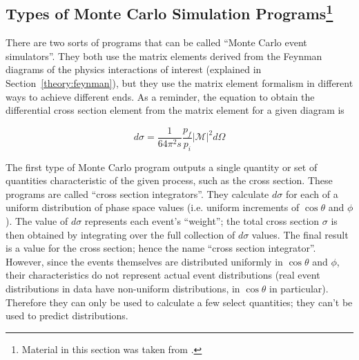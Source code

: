 \subsection{Types of Monte Carlo Simulation Programs\footnote{Material in this section was taken from \cite{MCLesHouchesGuide}.}}
\label{sim:MCexplain}




There are two sorts of programs that can be called 
``Monte Carlo event simulators''.  
They both use the matrix elements derived from 
the Feynman diagrams of the physics interactions of interest 
(explained in Section~\ref{theory:feynman}), %
but they use the matrix element formalism 
in different ways to achieve different ends.  
As a reminder, the equation to obtain the 
differential cross section element %
from the matrix element for a given diagram is 

\[
d \sigma
= \frac{1}{64 \pi^2 s} \frac{p_f}{p_i} \left| \mathcal{M} \right| ^2 d \Omega
\]

The first type of Monte Carlo program outputs 
a single quantity or set of quantities characteristic 
of the given process, 
such as the cross section.  
These programs are called ``cross section integrators''.  
They calculate 
$d\sigma$ for each of a uniform distribution of 
phase space values (i.e. uniform increments 
of $\cos\theta$ and $\phi$).  
The value of $d\sigma$ represents each event's ``weight''; 
the total cross section $\sigma$ is then obtained 
by integrating over the full collection of $d\sigma$ values.  
The final result is a value for the cross section; 
hence the name ``cross section integrator''.  
However, since the events themselves are distributed 
uniformly in $\cos\theta$ and $\phi$, 
their characteristics 
do not represent actual event distributions 
(real event distributions in data have 
non-uniform distributions, 
in $\cos\theta$ in particular).  
Therefore they can only be used to calculate 
a few select quantities; 
they can't be used to predict distributions.  


